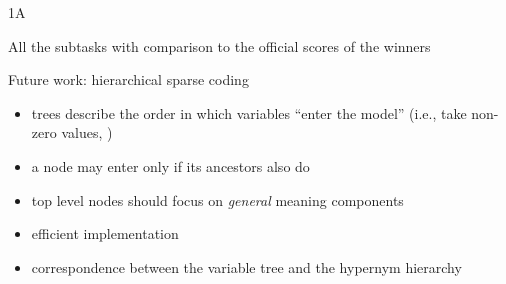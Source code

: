 \documentclass{beamer}
\newlength{\onecolwid}
\newcommand{\bull}[1]{
  \begin{itemize}
    \item #1
  \end{itemize}
}
\begin{document}
\begin{frame}[t]
\begin{columns}[t]
\begin{column}{\onecolwid}
\begin{block}{1A}

      \end{block}
      \begin{block}{All the subtasks}
        with comparison to the official scores of the winners

         


      \end{block} 

  \begin{block}{Future work: hierarchical sparse coding}
    \begin{itemize}
      \item trees describe the order in which variables “enter the model”
        (i.e., take non-zero values, \cite{Zhao:2009})
      \item a node may enter only if its ancestors also do
      \item %
        top level nodes should focus on \emph{general} meaning components 
      \item efficient implementation \citep{Yogatama:2015} 
      \item correspondence between 
        the variable tree and the hypernym hierarchy
    \end{itemize}


\end{block}
\end{column}
\end{columns}
\end{frame}
\end{document}
